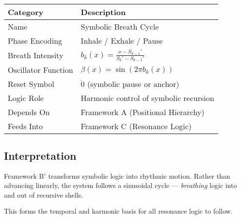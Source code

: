 \begin{center}
\begin{tabular}{|l|l|}
\hline
\textbf{Category} & \textbf{Description} \\
\hline
Name & Symbolic Breath Cycle \\
Phase Encoding & Inhale / Exhale / Pause \\
Breath Intensity & $b_k(x) = \frac{x - S_{k-1}'}{S_k' - S_{k-1}'}$ \\
Oscillator Function & $\beta(x) = \sin(2\pi b_k(x))$ \\
Reset Symbol & $\dot{0}$ (symbolic pause or anchor) \\
Logic Role & Harmonic control of symbolic recursion \\
Depends On & Framework A (Positional Hierarchy) \\
Feeds Into & Framework C (Resonance Logic) \\
\hline
\end{tabular}
\end{center}

\subsection*{Interpretation}

Framework B$'$ transforms symbolic logic into rhythmic motion. Rather than advancing linearly, the system follows a sinusoidal cycle — \emph{breathing} logic into and out of recursive shells.

This forms the temporal and harmonic basis for all resonance logic to follow.
